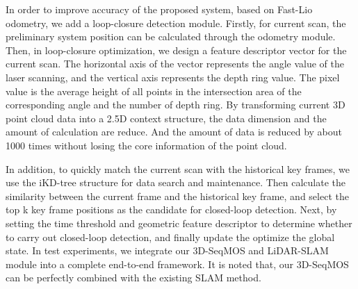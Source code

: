 \documentclass[lettersize,journal]{IEEEtran}
\begin{document}
In order to improve accuracy of the proposed system, based on Fast-Lio odometry, we add a loop-closure detection module. Firstly, for current scan, the preliminary system position can be calculated through the odometry module. Then, in loop-closure optimization, we design a feature descriptor vector for the current scan. The horizontal axis of the vector represents the angle value of the laser scanning, and the vertical axis represents the depth ring value. The pixel value is the average height of all points in the intersection area of the corresponding angle and the number of depth ring. By transforming current 3D point cloud data into a 2.5D context structure, the data dimension and the amount of calculation are reduce. And the amount of data is reduced by about 1000 times without losing the core information of the point cloud.

In addition, to quickly match the current scan with the historical key frames, we use the iKD-tree structure for data search and maintenance. Then calculate the similarity between the current frame and the historical key frame, and select the top k key frame positions as the candidate for closed-loop detection. Next, by setting the time threshold and geometric feature descriptor to determine whether to carry out closed-loop detection, and finally update the optimize the global state. In test experiments, we integrate our 3D-SeqMOS and LiDAR-SLAM module into a complete end-to-end framework. It is noted that, our 3D-SeqMOS can be perfectly combined with the existing SLAM method.


\end{document}
